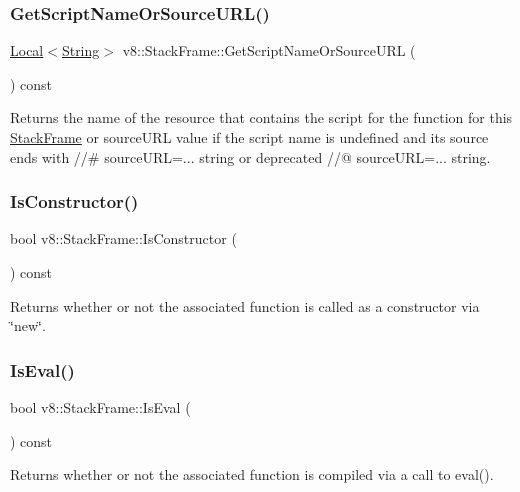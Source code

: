 \subsubsection{\texorpdfstring{Get\+Script\+Name\+Or\+Source\+U\+R\+L()}{GetScriptNameOrSourceURL()}}
{\footnotesize\ttfamily \mbox{\hyperlink{classv8_1_1Local}{Local}}$<$\mbox{\hyperlink{classv8_1_1String}{String}}$>$ v8\+::\+Stack\+Frame\+::\+Get\+Script\+Name\+Or\+Source\+U\+RL (\begin{DoxyParamCaption}{ }\end{DoxyParamCaption}) const}

Returns the name of the resource that contains the script for the function for this \mbox{\hyperlink{classv8_1_1StackFrame}{Stack\+Frame}} or source\+U\+RL value if the script name is undefined and its source ends with //\# source\+U\+RL=... string or deprecated //@ source\+U\+RL=... string. \mbox{\label{classv8_1_1StackFrame_a8f37df38214b6dc10655fc50f0341eb8}} 
\subsubsection{\texorpdfstring{Is\+Constructor()}{IsConstructor()}}
{\footnotesize\ttfamily bool v8\+::\+Stack\+Frame\+::\+Is\+Constructor (\begin{DoxyParamCaption}{ }\end{DoxyParamCaption}) const}

Returns whether or not the associated function is called as a constructor via \char`\"{}new\char`\"{}. \mbox{\label{classv8_1_1StackFrame_aa07e67a6a00adcd0f5c8c4ba7a82e54a}} 
\subsubsection{\texorpdfstring{Is\+Eval()}{IsEval()}}
{\footnotesize\ttfamily bool v8\+::\+Stack\+Frame\+::\+Is\+Eval (\begin{DoxyParamCaption}{ }\end{DoxyParamCaption}) const}

Returns whether or not the associated function is compiled via a call to eval(). \mbox{\label{classv8_1_1StackFrame_aec6d28360828b8cadc3da6a5dbd83d89}} 
